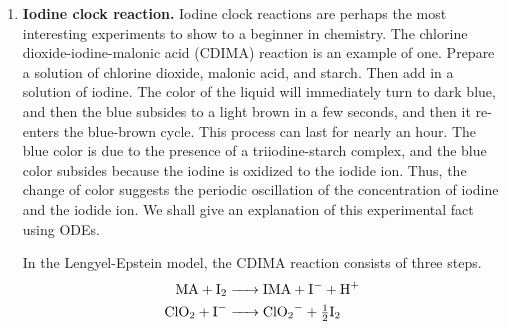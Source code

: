 \documentclass[../psets.tex]{subfiles}
\begin{document}
\begin{enumerate}
\begin{enumerate}
        \begin{proof}
            Consider the points along the $x$- and $y$-axes. For the points along the $x$-axis, we have $y=0$ and thus
            \begin{align*}
                \dv{x}{t} &= -k_1\cnc[0]{E}x\\
                \dv{y}{t} &= k_1\cnc[0]{E}x
            \end{align*}
            Importantly, the lower equation above implies that the vector field points inward toward first quadrant at every point along the $x$-axis.\par
            For the points along the $y$-axis, we have $x=0$ and thus
            \begin{align*}
                \dv{x}{t} &= k_{-1}y\\
                \dv{y}{t} &= -(k_{-1}+k_2)y
            \end{align*}
            Thus, similarly, the vector field points inward toward first quadrant at every point along the $y$-axis. Thus, by the proposition from Lecture 7.2, since $f(x)$ is transversal to the boundary and inward pointing, the set is invariant.
        \end{proof}
    \end{enumerate}
    \item \textbf{Iodine clock reaction.} Iodine clock reactions are perhaps the most interesting experiments to show to a beginner in chemistry. The chlorine dioxide-iodine-malonic acid (CDIMA) reaction is an example of one. Prepare a solution of chlorine dioxide, malonic acid, and starch. Then add in a solution of iodine. The color of the liquid will immediately turn to dark blue, and then the blue subsides to a light brown in a few seconds, and then it re-enters the blue-brown cycle. This process can last for nearly an hour. The blue color is due to the presence of a triiodine-starch complex, and the blue color subsides because the iodine is oxidized to the iodide ion. Thus, the change of color suggests the periodic oscillation of the concentration of iodine and the iodide ion. We shall give an explanation of this experimental fact using ODEs.\par
    In the Lengyel-Epstein model, the CDIMA reaction consists of three steps.
    \begin{align*}
        \ce{MA + I2} &\ce{->} \ce{IMA + I- + H+}\\
        \ce{ClO2 + I-} &\ce{->} \ce{ClO2- + \tfrac{1}{2}I2}\\

\end{align*}
\end{enumerate}
\end{document}
